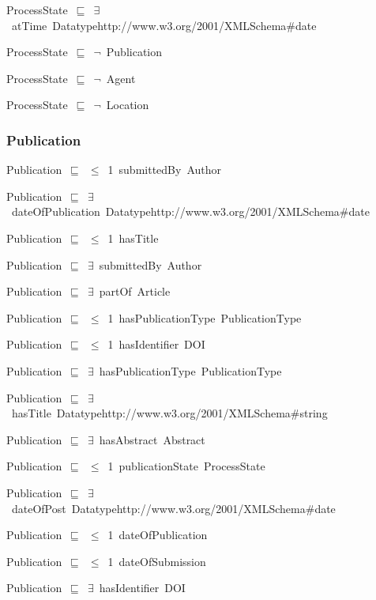 \documentclass{article}
\begin{document}
ProcessState~\ensuremath{\sqsubseteq}~\ensuremath{\exists}~atTime~Datatypehttp://www.w3.org/2001/XMLSchema#date~

ProcessState~\ensuremath{\sqsubseteq}~\ensuremath{\lnot}~Publication

ProcessState~\ensuremath{\sqsubseteq}~\ensuremath{\lnot}~Agent

ProcessState~\ensuremath{\sqsubseteq}~\ensuremath{\lnot}~Location

\subsubsection*{Publication}

Publication~\ensuremath{\sqsubseteq}~\ensuremath{\leq}~1~submittedBy~Author~

Publication~\ensuremath{\sqsubseteq}~\ensuremath{\exists}~dateOfPublication~Datatypehttp://www.w3.org/2001/XMLSchema#date~

Publication~\ensuremath{\sqsubseteq}~\ensuremath{\leq}~1~hasTitle~

Publication~\ensuremath{\sqsubseteq}~\ensuremath{\exists}~submittedBy~Author~

Publication~\ensuremath{\sqsubseteq}~\ensuremath{\exists}~partOf~Article~

Publication~\ensuremath{\sqsubseteq}~\ensuremath{\leq}~1~hasPublicationType~PublicationType~

Publication~\ensuremath{\sqsubseteq}~\ensuremath{\leq}~1~hasIdentifier~DOI~

Publication~\ensuremath{\sqsubseteq}~\ensuremath{\exists}~hasPublicationType~PublicationType~

Publication~\ensuremath{\sqsubseteq}~\ensuremath{\exists}~hasTitle~Datatypehttp://www.w3.org/2001/XMLSchema#string~

Publication~\ensuremath{\sqsubseteq}~\ensuremath{\exists}~hasAbstract~Abstract~

Publication~\ensuremath{\sqsubseteq}~\ensuremath{\leq}~1~publicationState~ProcessState~

Publication~\ensuremath{\sqsubseteq}~\ensuremath{\exists}~dateOfPost~Datatypehttp://www.w3.org/2001/XMLSchema#date~

Publication~\ensuremath{\sqsubseteq}~\ensuremath{\leq}~1~dateOfPublication~

Publication~\ensuremath{\sqsubseteq}~\ensuremath{\leq}~1~dateOfSubmission~

Publication~\ensuremath{\sqsubseteq}~\ensuremath{\exists}~hasIdentifier~DOI~
\end{document}
